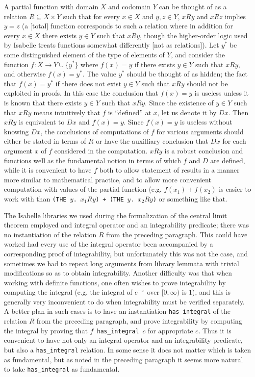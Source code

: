\documentclass{article}
\theoremstyle{definition}
\begin{document}
A partial function with domain $X$ and codomain $Y$ can be thought of as a relation $R \subseteq X \times Y$ such that for every $x \in X$ and $y, z \in Y$, $xRy$ and $xRz$ implies $y=z$ (a [total] function corresponds to such a relation where in addition for every $x \in X$ there exists $y \in Y$ such that $xRy$, though the higher-order logic used by Isabelle treats functions somewhat differently [not as relations]). Let $y^*$ be some distinguished element of the type of elements of $Y$, and consider the function $f\colon X \rightarrow Y \cup \{y^*\}$ where $f(x) = y$ if there exists $y \in Y$ such that $xRy$, and otherwise $f(x) = y^*$. The value $y^*$ should be thought of as hidden; the fact that $f(x) = y^*$ if there does not exist $y \in Y$ such that $xRy$ should not be exploited in proofs. In this case the conclusion that $f(x) = y$ is useless unless it is known that there exists $y \in Y$ such that $xRy$. Since the existence of $y \in Y$ such that $xRy$ means intuitively that $f$ is ``defined'' at $x$, let us denote it by $Dx$. Then $xRy$ is equivalent to $Dx$ and $f(x) = y$. Since $f(x) = y$ is useless without knowing $Dx$, the conclusions of computations of $f$ for various arguments should either be stated in terms of $R$ or have the auxilliary conclusion that $Dx$ for each argument $x$ of $f$ considered in the computation. $xRy$ is a robust conclusion and functions well as the fundamental notion in terms of which $f$ and $D$ are defined, while it is convenient to have $f$ both to allow statement of results in a manner more similar to mathematical practice, and to allow more convenient computation with values of the partial function (e.g. $f(x_1) + f(x_2)$ is easier to work with than \texttt{(THE $y$.\!\!\! $x_1Ry$) + (THE $y$.\!\!\! $x_2Ry$)} or something like that.

The Isabelle libraries we used during the formalization of the central limit theorem employed and integral operator and an integrability predicate; there was no instantiation of the relation $R$ from the preceding paragraph. This could have worked had every use of the integral operator been accompanied by a corresponding proof of integrability, but unfortunately this was not the case, and sometimes we had to repeat long arguments from library lemmata with trivial modifications so as to obtain integrability. Another difficulty was that when working with definite functions, one often wishes to prove integrability by computing the integral (e.g. the integral of $e^{-x}$ over $[0, \infty)$ is $1$), and this is generally very inconvenient to do when integrability must be verified separately. A better plan in such cases is to have an instantiation \texttt{has\_integral} of the relation $R$ from the preceding paragraph, and prove integrability by computing the integral by proving that \texttt{$f$ has\_integral $c$} for appropriate $c$. Thus it is convenient to have not only an integral operator and an integrability predicate, but also a \texttt{has\_integral} relation. In some sense it does not matter which is taken as fundamental, but as noted in the preceding paragraph it seems more natural to take \texttt{has\_integral} as fundamental.
\end{document}
